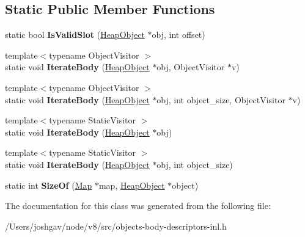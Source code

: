 \subsection*{Static Public Member Functions}
\begin{DoxyCompactItemize}
\item 
static bool {\bfseries Is\+Valid\+Slot} (\hyperlink{classv8_1_1internal_1_1_heap_object}{Heap\+Object} $\ast$obj, int offset)\hypertarget{classv8_1_1internal_1_1_code_1_1_body_descriptor_af66ae0469542c4634743007de533b38f}{}\label{classv8_1_1internal_1_1_code_1_1_body_descriptor_af66ae0469542c4634743007de533b38f}

\item 
{\footnotesize template$<$typename Object\+Visitor $>$ }\\static void {\bfseries Iterate\+Body} (\hyperlink{classv8_1_1internal_1_1_heap_object}{Heap\+Object} $\ast$obj, Object\+Visitor $\ast$v)\hypertarget{classv8_1_1internal_1_1_code_1_1_body_descriptor_a573dbc6bdedb82a85d1b56ff7a44ddce}{}\label{classv8_1_1internal_1_1_code_1_1_body_descriptor_a573dbc6bdedb82a85d1b56ff7a44ddce}

\item 
{\footnotesize template$<$typename Object\+Visitor $>$ }\\static void {\bfseries Iterate\+Body} (\hyperlink{classv8_1_1internal_1_1_heap_object}{Heap\+Object} $\ast$obj, int object\+\_\+size, Object\+Visitor $\ast$v)\hypertarget{classv8_1_1internal_1_1_code_1_1_body_descriptor_ab98765c27b9343d0cc21951bb5e636af}{}\label{classv8_1_1internal_1_1_code_1_1_body_descriptor_ab98765c27b9343d0cc21951bb5e636af}

\item 
{\footnotesize template$<$typename Static\+Visitor $>$ }\\static void {\bfseries Iterate\+Body} (\hyperlink{classv8_1_1internal_1_1_heap_object}{Heap\+Object} $\ast$obj)\hypertarget{classv8_1_1internal_1_1_code_1_1_body_descriptor_a3e3ebec40a4d3968ccfd960446daf8b6}{}\label{classv8_1_1internal_1_1_code_1_1_body_descriptor_a3e3ebec40a4d3968ccfd960446daf8b6}

\item 
{\footnotesize template$<$typename Static\+Visitor $>$ }\\static void {\bfseries Iterate\+Body} (\hyperlink{classv8_1_1internal_1_1_heap_object}{Heap\+Object} $\ast$obj, int object\+\_\+size)\hypertarget{classv8_1_1internal_1_1_code_1_1_body_descriptor_a0b1a197aa70783cb0862df35c82815e1}{}\label{classv8_1_1internal_1_1_code_1_1_body_descriptor_a0b1a197aa70783cb0862df35c82815e1}

\item 
static int {\bfseries Size\+Of} (\hyperlink{classv8_1_1internal_1_1_map}{Map} $\ast$map, \hyperlink{classv8_1_1internal_1_1_heap_object}{Heap\+Object} $\ast$object)\hypertarget{classv8_1_1internal_1_1_code_1_1_body_descriptor_a805bffb9312d7943094aee8b1b114092}{}\label{classv8_1_1internal_1_1_code_1_1_body_descriptor_a805bffb9312d7943094aee8b1b114092}

\end{DoxyCompactItemize}


The documentation for this class was generated from the following file\+:\begin{DoxyCompactItemize}
\item 
/\+Users/joshgav/node/v8/src/objects-\/body-\/descriptors-\/inl.\+h\end{DoxyCompactItemize}

